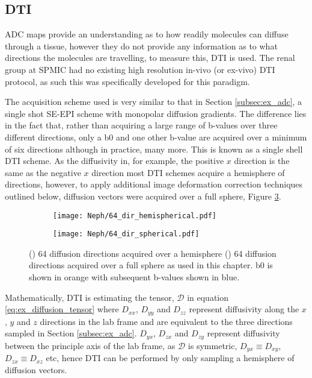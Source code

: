 \subsection{\acl*{DTI}}

\ac{ADC} maps provide an understanding as to how readily molecules can diffuse through a tissue, however they do not provide any information as to what directions the molecules are travelling, to measure this, \ac{DTI} is used. The renal group at \ac{SPMIC} had no existing high resolution in-vivo (or ex-vivo) \ac{DTI} protocol, as such this was specifically developed for this paradigm.

The acquisition scheme used is very similar to that in Section \ref{subsec:ex_adc}, a single shot \ac{SE}-\ac{EPI} scheme with monopolar diffusion gradients. The difference lies in the fact that, rather than acquiring a large range of b-values over three different directions, only a b0 and one other b-value are acquired over a minimum of six directions although in practice, many more. This is known as a single shell \ac{DTI} scheme. As the diffusivity in, for example, the positive $x$ direction is the same as the negative $x$ direction most \ac{DTI} schemes acquire a hemisphere of directions, however, to apply additional image deformation correction techniques outlined below, diffusion vectors were acquired over a full sphere, Figure \ref{fig:ex_dti_vectors}.

\begin{figure}[H]
	\centering
	\begin{subfigure}[c]{0.47\textwidth}
		\centering
		\texttt{[image: Neph/64\_dir\_hemispherical.pdf]}
		\caption{}
		\label{fig:ex_dti_vectors_half}
	\end{subfigure}
	\hfill
	\begin{subfigure}[c]{0.47\textwidth}
		\centering
		\texttt{[image: Neph/64\_dir\_spherical.pdf]}
		\caption{}
		\label{fig:ex_dti_vectors_full}
	\end{subfigure}
	\caption{() 64 diffusion directions acquired over a hemisphere () 64 diffusion directions acquired over a full sphere as used in this chapter. b0 is shown in orange with subsequent b-values shown in blue. }
	\label{fig:ex_dti_vectors}
\end{figure}

Mathematically, \ac{DTI} is estimating the tensor, $\mathscr{D}$ in equation \eqref{eq:ex_diffusion_tensor} where $D_{xx}$, $D_{yy}$ and $D_{zz}$ represent diffusivity along the $x$, $y$ and $z$ directions in the lab frame and are equivalent to the three directions sampled in Section \ref{subsec:ex_adc}. $D_{yx}$, $D_{zx}$ and $D_{zy}$ represent diffusivity between the principle axis of the lab frame, as $\mathscr{D}$ is symmetric, $D_{yx} \equiv D_{xy}$, $D_{zx} \equiv D_{xz}$ etc, hence \ac{DTI} can be performed by only sampling a hemisphere of diffusion vectors.

